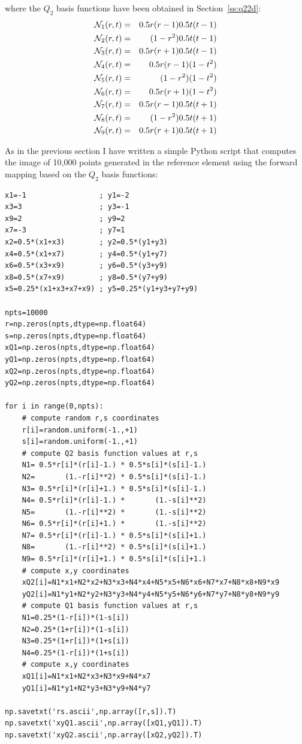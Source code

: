 where the $Q_2$ basis functions have been obtained in Section~\ref{ss:q22d}:
\begin{eqnarray}
{\mathcal{N}}_1(r,t)&=& 0.5r(r-1)  0.5t(t-1) \nonumber\\
{\mathcal{N}}_2(r,t)&=&      (1-r^2)  0.5t(t-1) \nonumber\\
{\mathcal{N}}_3(r,t)&=& 0.5r(r+1)  0.5t(t-1) \nonumber\\
{\mathcal{N}}_4(r,t)&=& 0.5r(r-1)       (1-t^2) \nonumber\\
{\mathcal{N}}_5(r,t)&=&      (1-r^2)       (1-t^2) \nonumber\\
{\mathcal{N}}_6(r,t)&=& 0.5r(r+1)       (1-t^2) \nonumber\\
{\mathcal{N}}_7(r,t)&=& 0.5r(r-1)  0.5t(t+1) \nonumber\\
{\mathcal{N}}_8(r,t)&=&      (1-r^2)  0.5t(t+1) \nonumber\\
{\mathcal{N}}_9(r,t)&=& 0.5r(r+1)  0.5t(t+1) \nonumber
\end{eqnarray}

As in the previous section I have written a simple Python script that 
computes the image of 10,000 points generated in the reference element
using the forward mapping based on the $Q_2$ basis functions:
\begin{lstlisting}
x1=-1                 ; y1=-2
x3=3                  ; y3=-1
x9=2                  ; y9=2
x7=-3                 ; y7=1
x2=0.5*(x1+x3)        ; y2=0.5*(y1+y3)
x4=0.5*(x1+x7)        ; y4=0.5*(y1+y7)
x6=0.5*(x3+x9)        ; y6=0.5*(y3+y9)
x8=0.5*(x7+x9)        ; y8=0.5*(y7+y9)
x5=0.25*(x1+x3+x7+x9) ; y5=0.25*(y1+y3+y7+y9)

npts=10000
r=np.zeros(npts,dtype=np.float64)   
s=np.zeros(npts,dtype=np.float64)   
xQ1=np.zeros(npts,dtype=np.float64)   
yQ1=np.zeros(npts,dtype=np.float64)   
xQ2=np.zeros(npts,dtype=np.float64)   
yQ2=np.zeros(npts,dtype=np.float64)   

for i in range(0,npts):
    # compute random r,s coordinates
    r[i]=random.uniform(-1.,+1)
    s[i]=random.uniform(-1.,+1)
    # compute Q2 basis function values at r,s
    N1= 0.5*r[i]*(r[i]-1.) * 0.5*s[i]*(s[i]-1.)
    N2=       (1.-r[i]**2) * 0.5*s[i]*(s[i]-1.)
    N3= 0.5*r[i]*(r[i]+1.) * 0.5*s[i]*(s[i]-1.)
    N4= 0.5*r[i]*(r[i]-1.) *       (1.-s[i]**2)
    N5=       (1.-r[i]**2) *       (1.-s[i]**2)
    N6= 0.5*r[i]*(r[i]+1.) *       (1.-s[i]**2)
    N7= 0.5*r[i]*(r[i]-1.) * 0.5*s[i]*(s[i]+1.)
    N8=       (1.-r[i]**2) * 0.5*s[i]*(s[i]+1.)
    N9= 0.5*r[i]*(r[i]+1.) * 0.5*s[i]*(s[i]+1.)
    # compute x,y coordinates
    xQ2[i]=N1*x1+N2*x2+N3*x3+N4*x4+N5*x5+N6*x6+N7*x7+N8*x8+N9*x9
    yQ2[i]=N1*y1+N2*y2+N3*y3+N4*y4+N5*y5+N6*y6+N7*y7+N8*y8+N9*y9
    # compute Q1 basis function values at r,s
    N1=0.25*(1-r[i])*(1-s[i])
    N2=0.25*(1+r[i])*(1-s[i])
    N3=0.25*(1+r[i])*(1+s[i])
    N4=0.25*(1-r[i])*(1+s[i])
    # compute x,y coordinates
    xQ1[i]=N1*x1+N2*x3+N3*x9+N4*x7
    yQ1[i]=N1*y1+N2*y3+N3*y9+N4*y7

np.savetxt('rs.ascii',np.array([r,s]).T)
np.savetxt('xyQ1.ascii',np.array([xQ1,yQ1]).T)
np.savetxt('xyQ2.ascii',np.array([xQ2,yQ2]).T)
\end{lstlisting}

